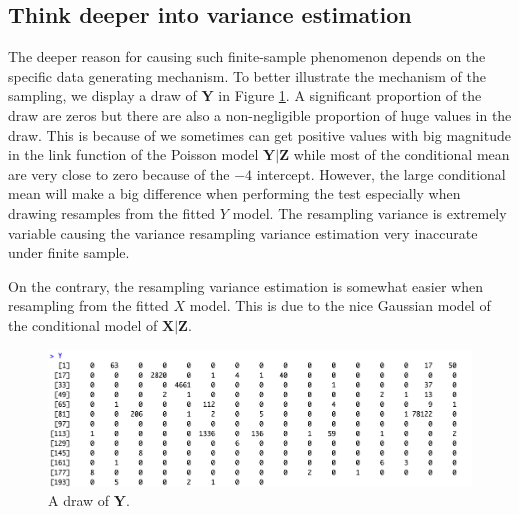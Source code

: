 \documentclass{article}
\begin{document}
\subsection{Think deeper into variance estimation}

The deeper reason for causing such finite-sample phenomenon depends on the specific data generating mechanism.
To better illustrate the mechanism of the sampling, we display a draw of $\bm Y$ in Figure \ref{fig:draw_data}.
A significant proportion of the draw are zeros but there are also a non-negligible proportion of huge values in the draw.
This is because of we sometimes can get positive values with big magnitude in the link function of the Poisson model 
$\bm Y|\bm Z$ while most of the conditional mean are very close to zero because of the $-4$ intercept. However, the 
large conditional mean will make a big difference when performing the test especially when drawing resamples 
from the fitted $Y$ model. The resampling variance is extremely variable causing the variance resampling variance estimation 
very inaccurate under finite sample. 

On the contrary, the resampling variance estimation is somewhat easier when resampling from the fitted $X$ model. This is 
due to the nice Gaussian model of the conditional model of $\bm X|\bm Z$.

\begin{figure}[!h]
    \centering
    \includegraphics[scale = 0.35]{Figures/Q2/draw_data.png}
    \caption{A draw of $\bm Y$.}
    \label{fig:draw_data}
\end{figure}


\newpage
{\scriptsize
\printbibliography
}

\newpage



\end{document}
